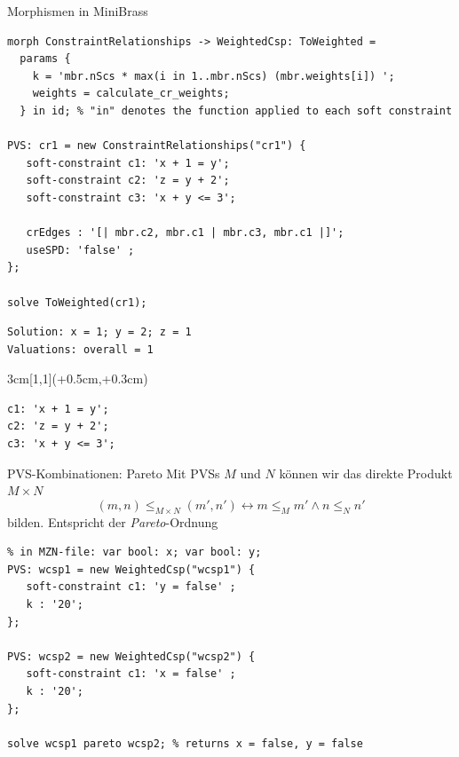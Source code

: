 \documentclass[handout,10pt,xcolor={dvipsnames},fleqn]{beamer}
\begin{document}
\begin{frame}[fragile]{Morphismen in MiniBrass}
\begin{lstlisting}
morph ConstraintRelationships -> WeightedCsp: ToWeighted = 
  params {
    k = 'mbr.nScs * max(i in 1..mbr.nScs) (mbr.weights[i]) ';
    weights = calculate_cr_weights;
  } in id; % "in" denotes the function applied to each soft constraint 
   
PVS: cr1 = new ConstraintRelationships("cr1") {
   soft-constraint c1: 'x + 1 = y';
   soft-constraint c2: 'z = y + 2';
   soft-constraint c3: 'x + y <= 3';
   
   crEdges : '[| mbr.c2, mbr.c1 | mbr.c3, mbr.c1 |]';
   useSPD: 'false' ;
}; 

solve ToWeighted(cr1);
\end{lstlisting}
\begin{Verbatim}[fontsize=\small]
Solution: x = 1; y = 2; z = 1
Valuations: overall = 1
\end{Verbatim}
\begin{textblock*}{3cm}[1,1](\textwidth+0.5cm,\textheight+0.3cm)
\begin{center}
\begin{Verbatim}[fontsize=\small]
c1: 'x + 1 = y';
c2: 'z = y + 2';
c3: 'x + y <= 3';   
\end{Verbatim}

\end{center}
\end{textblock*}

\end{frame}

\begin{frame}[fragile]{PVS-Kombinationen: Pareto} \small
Mit PVSs $M$ und $N$ können wir das direkte Produkt $M \times N$ 
\[
(m, n) \leq_{M \times N} (m', n') \leftrightarrow m \leq_M m' \wedge n \leq_N n'
\]
bilden. Entspricht der \emph{Pareto}-Ordnung
\begin{lstlisting}
% in MZN-file: var bool: x; var bool: y;
PVS: wcsp1 = new WeightedCsp("wcsp1") {
   soft-constraint c1: 'y = false' ;
   k : '20';
}; 

PVS: wcsp2 = new WeightedCsp("wcsp2") {
   soft-constraint c1: 'x = false' ;
   k : '20';
}; 

solve wcsp1 pareto wcsp2; % returns x = false, y = false
\end{lstlisting}
\end{frame}
\end{document}
